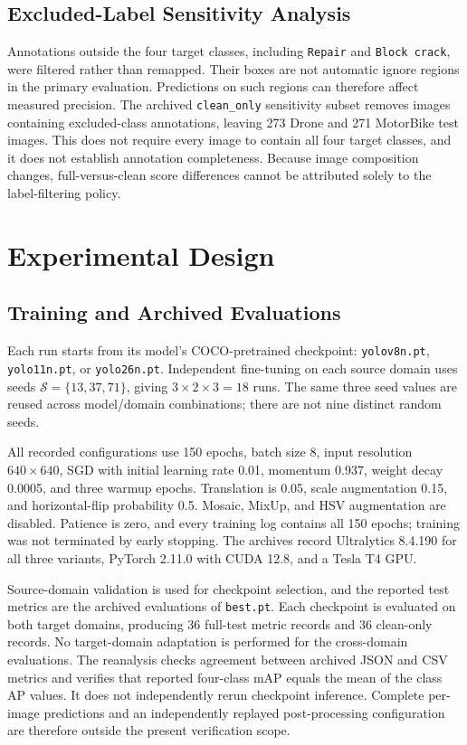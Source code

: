 \documentclass[conference,a4paper]{IEEEtran}
\begin{document}
\subsection{Excluded-Label Sensitivity Analysis}
Annotations outside the four target classes, including \texttt{Repair} and \texttt{Block crack}, were filtered rather than remapped. Their boxes are not automatic ignore regions in the primary evaluation. Predictions on such regions can therefore affect measured precision. The archived \texttt{clean\_only} sensitivity subset removes images containing excluded-class annotations, leaving 273 Drone and 271 MotorBike test images. This does not require every image to contain all four target classes, and it does not establish annotation completeness. Because image composition changes, full-versus-clean score differences cannot be attributed solely to the label-filtering policy.

\section{Experimental Design}
\subsection{Training and Archived Evaluations}
Each run starts from its model's COCO-pretrained checkpoint: \texttt{yolov8n.pt}, \texttt{yolo11n.pt}, or \texttt{yolo26n.pt}. Independent fine-tuning on each source domain uses seeds $\mathcal S=\{13,37,71\}$, giving $3\times2\times3=18$ runs. The same three seed values are reused across model/domain combinations; there are not nine distinct random seeds.

All recorded configurations use 150 epochs, batch size 8, input resolution $640\times640$, SGD with initial learning rate 0.01, momentum 0.937, weight decay 0.0005, and three warmup epochs. Translation is 0.05, scale augmentation 0.15, and horizontal-flip probability 0.5. Mosaic, MixUp, and HSV augmentation are disabled. Patience is zero, and every training log contains all 150 epochs; training was not terminated by early stopping. The archives record Ultralytics 8.4.190 for all three variants, PyTorch 2.11.0 with CUDA 12.8, and a Tesla T4 GPU.

Source-domain validation is used for checkpoint selection, and the reported test metrics are the archived evaluations of \texttt{best.pt}. Each checkpoint is evaluated on both target domains, producing 36 full-test metric records and 36 clean-only records. No target-domain adaptation is performed for the cross-domain evaluations. The reanalysis checks agreement between archived JSON and CSV metrics and verifies that reported four-class mAP equals the mean of the class AP values. It does not independently rerun checkpoint inference. Complete per-image predictions and an independently replayed post-processing configuration are therefore outside the present verification scope.
\end{document}

